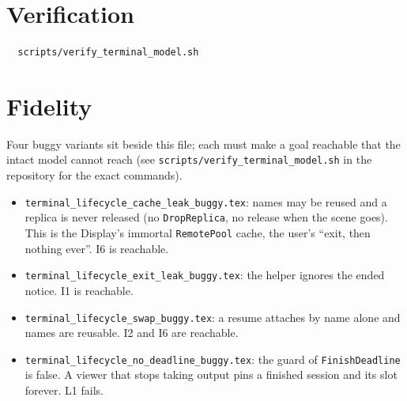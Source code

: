 \documentclass[a4paper,10pt,fleqn]{article}
\begin{document}
\section{Verification}
\label{sec:verify}

\begin{verbatim}
  scripts/verify_terminal_model.sh
\end{verbatim}

\section{Fidelity}

Four buggy variants sit beside this file; each must make a goal reachable
that the intact model cannot reach (see \texttt{scripts/verify\_terminal\_model.sh}
in the repository for the exact commands).
\begin{itemize}
  \item \texttt{terminal\_lifecycle\_cache\_leak\_buggy.tex}: names may be
    reused and a replica is never released (no \texttt{DropReplica}, no
    release when the scene goes).  This is the Display's immortal
    \texttt{RemotePool} cache, the user's ``exit, then nothing ever''.
    I6 is reachable.
  \item \texttt{terminal\_lifecycle\_exit\_leak\_buggy.tex}: the helper
    ignores the ended notice.  I1 is reachable.
  \item \texttt{terminal\_lifecycle\_swap\_buggy.tex}: a resume attaches by
    name alone and names are reusable.  I2 and I6 are reachable.
  \item \texttt{terminal\_lifecycle\_no\_deadline\_buggy.tex}: the
    guard of \texttt{FinishDeadline} is false.  A viewer that stops taking
    output pins a finished session and its slot forever.  L1 fails.
\end{itemize}
\end{document}
